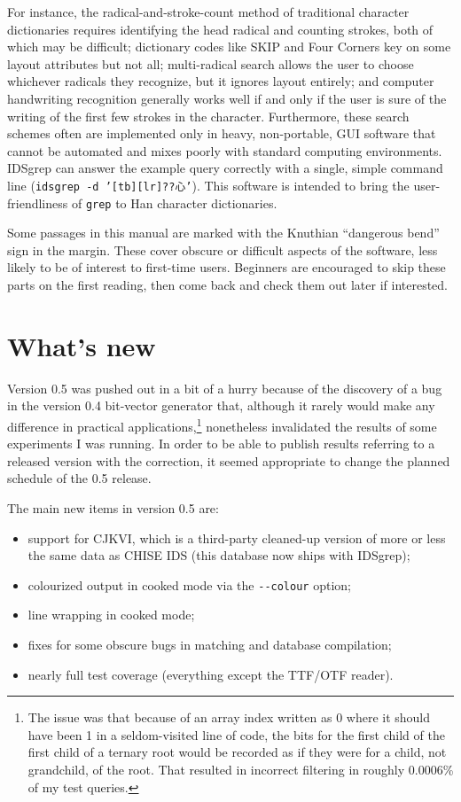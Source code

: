 \documentclass[twocolumn]{report}
\newcommand{\DangerousBend}{\marginpar{\large\hfill\dbend\hfill\null}}
\begin{document}
For instance, the radical-and-stroke-count method of traditional character
dictionaries requires identifying the head radical and counting strokes,
both of which may be difficult; dictionary codes like SKIP and Four Corners
key on some layout attributes but not all; multi-radical search allows the
user to choose whichever radicals they recognize, but it ignores layout
entirely; and computer handwriting recognition generally works well if and
only if the user is sure of the writing of the first few strokes in the
character.  Furthermore, these search schemes often are implemented only in
heavy, non-portable, GUI software that cannot be automated and mixes poorly
with standard computing environments.  IDSgrep can answer the example query
correctly with a single, simple command line (\texttt{idsgrep -d
'[tb][lr]??心'}).  This software is intended to bring the user-friendliness
of \texttt{grep} to Han character dictionaries.

Some \DangerousBend passages in this manual are marked with the Knuthian
``dangerous bend'' sign in the margin.  These cover obscure or difficult
aspects of the software, less likely to be of interest to first-time users. 
Beginners are encouraged to skip these parts on the first reading, then come
back and check them out later if interested.


\section{What's new}

Version 0.5 was pushed out in a bit of a hurry because of the discovery of a
bug in the version 0.4 bit-vector generator that, although it rarely would make any
difference in practical applications,\footnote{The issue was that
because of an array index written as 0 where it should have been 1 in a
seldom-visited line of code, the bits for the first child of the first child
of a ternary root would be recorded as if they were for a child, not
grandchild, of the root.  That resulted in incorrect filtering in roughly
0.0006\% of my test queries.} nonetheless invalidated the results of
some experiments I was running.  In order to be able to publish results
referring to a released version with the correction, it seemed appropriate
to change the planned schedule of the 0.5 release.

The main new items in version 0.5 are:
\begin{itemize}
  \item support for CJKVI, which is a third-party cleaned-up version of more
    or less the same data as CHISE IDS (this database now ships with
    IDSgrep);
  \item colourized output in cooked mode via the \texttt{-{}-colour} option;
  \item line wrapping in cooked mode;
  \item fixes for some obscure bugs in matching and database compilation;
  \item nearly full test coverage (everything except the TTF/OTF reader).
\end{itemize}
\end{document}
